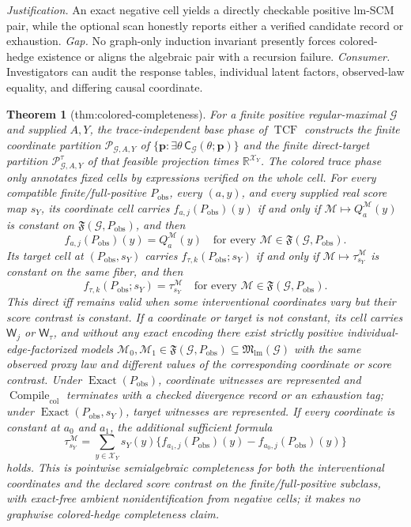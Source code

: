 \documentclass{article}
\newtheorem{theorem}{Theorem}
\begin{document}
\par\smallskip\noindent \textit{Justification.} An exact negative cell yields a directly checkable positive lm-SCM pair, while the optional scan honestly reports either a verified candidate record or exhaustion. \textit{Gap.} No graph-only induction invariant presently forces colored-hedge existence or aligns the algebraic pair with a recursion failure. \textit{Consumer.} Investigators can audit the response tables, individual latent factors, observed-law equality, and differing causal coordinate.

\begin{theorem}[thm:colored-completeness]\label{thm:colored-completeness}
For a finite positive regular-maximal \(\mathcal G\) and supplied \(A,Y\), the trace-independent base phase of \(\operatorname{TCF}\) constructs the finite coordinate partition \(\mathscr P_{\mathcal G,A,Y}\) of \(\{\mathbf p:\exists\theta\,\mathsf C_{\mathcal G}(\theta;\mathbf p)\}\) and the finite direct-target partition \(\mathscr P^{\tau}_{\mathcal G,A,Y}\) of that feasible projection times \(\mathbb R^{\mathcal X_Y}\). The colored trace phase only annotates fixed cells by expressions verified on the whole cell. For every compatible finite/full-positive \(P_{\mathrm{obs}}\), every \((a,y)\), and every supplied real score map \(s_Y\), its coordinate cell carries \(f_{a,j}(P_{\mathrm{obs}})(y)\) if and only if \(\mathcal M\mapsto Q_a^{\mathcal M}(y)\) is constant on \(\mathfrak F(\mathcal G,P_{\mathrm{obs}})\), and then
\[
f_{a,j}(P_{\mathrm{obs}})(y)=Q_a^{\mathcal M}(y)
\quad\text{for every }\mathcal M\in\mathfrak F(\mathcal G,P_{\mathrm{obs}}).
\]
Its target cell at \((P_{\mathrm{obs}},s_Y)\) carries \(f_{\tau,k}(P_{\mathrm{obs}};s_Y)\) if and only if \(\mathcal M\mapsto\tau_{s_Y}^{\mathcal M}\) is constant on the same fiber, and then
\[
f_{\tau,k}(P_{\mathrm{obs}};s_Y)=\tau_{s_Y}^{\mathcal M}
\quad\text{for every }\mathcal M\in\mathfrak F(\mathcal G,P_{\mathrm{obs}}).
\]
This direct iff remains valid when some interventional coordinates vary but their score contrast is constant. If a coordinate or target is not constant, its cell carries \(\mathsf W_j\) or \(\mathsf W_{\tau}\), and without any exact encoding there exist strictly positive individual-edge-factorized models \(\mathcal M_0,\mathcal M_1\in\mathfrak F(\mathcal G,P_{\mathrm{obs}})\subseteq\mathfrak M_{\mathrm{lm}}(\mathcal G)\) with the same observed proxy law and different values of the corresponding coordinate or score contrast. Under \(\operatorname{Exact}(P_{\mathrm{obs}})\), coordinate witnesses are represented and \(\operatorname{Compile}_{\mathrm{col}}\) terminates with a checked divergence record or an exhaustion tag; under \(\operatorname{Exact}(P_{\mathrm{obs}},s_Y)\), target witnesses are represented. If every coordinate is constant at \(a_0\) and \(a_1\), the additional sufficient formula
\[
\tau_{s_Y}^{\mathcal M}
=\sum_{y\in\mathcal X_Y}s_Y(y)
\{f_{a_1,j}(P_{\mathrm{obs}})(y)-f_{a_0,j}(P_{\mathrm{obs}})(y)\}
\]
holds. This is pointwise semialgebraic completeness for both the interventional coordinates and the declared score contrast on the finite/full-positive subclass, with exact-free ambient nonidentification from negative cells; it makes no graphwise colored-hedge completeness claim.
\end{theorem}
\end{document}
